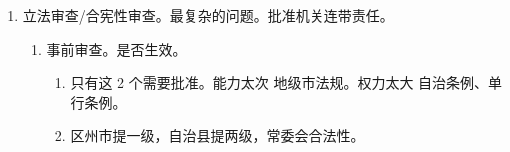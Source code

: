 \begin{enumerate}
\begin{enumerate}
          \item 提交表决前。4 种情形。不交付、要撤回、无共识、可终止、可延长。
                \begin{enumerate}
                  \item 暂不交付表决。单独表决失败。
                  \item 撤回。找管事的。人大 \yjt 主席团、人常 \yjt 委员长会议。
                  \item 无法形成共识。主席团提出 \yjt 大会决定 \yjt 授权常委会干活。
                  \item 2 年可终止，必要时委员长会议可延长。
                \end{enumerate}
          \item 审议程序。\yi 可以找相关人大代表列席。\er 三读程序。一般讨论 3 回，紧急 1 回（）。
          \item 表决。
                \begin{enumerate}
                  \item 一般表决。直接在全人大投票。
                  \item 单独表决（分歧大，试水）。
                  \item 合并表决（多部法里的同类项） \yjt 可以 + 仅常委的立法程序。
                \end{enumerate}
          \item 通过、发布。
          \item 备案。\yi 变通备案 + 单独说明。\er 但凡备案都是 30 日，赶早不赶迟。
          \item 公布。
                \begin{enumerate}
                  \item 对应的机关公报、报纸（全国、地方）、官方网站（人大、政府的法制信息网）。
                  \item 法律、法规扩大公布范围。提案说明、草案说明、审议结果报告、各方意见。
                \end{enumerate}
        \end{enumerate}
  \item 立法审查/合宪性审查。最复杂的问题。批准机关连带责任。
        \begin{enumerate}
          \item 事前审查。是否生效。
                \begin{enumerate}
                  \item 只有这 2 个需要批准。能力太次 \yjt 地级市法规。权力太大 \yjt 自治条例、单行条例。
                  \item 区州市提一级，自治县提两级，常委会合法性。

\end{enumerate}
\end{enumerate}
\end{enumerate}
